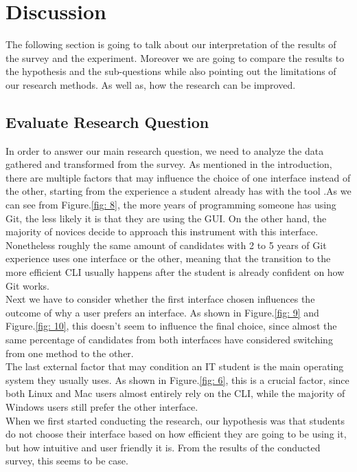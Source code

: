 \documentclass[]{report}
\begin{document}
	\section{Discussion}
	
	The following section is going to talk about our interpretation of the results of the survey and the experiment. Moreover we are going to compare the results to the hypothesis and the sub-questions while also pointing out the limitations of our research methods. As well as, how the research can be improved.
	
	\subsection{Evaluate Research Question}
	In order to answer our main research question, we need to analyze the data gathered and transformed from the survey.
	As mentioned in the introduction, there are multiple factors that may influence the choice of one interface instead of the other, starting from the experience a student already has with the tool .As we can see from Figure.\ref{fig: 8}, the more years of programming someone has using Git, the less likely it is that they are using the GUI. On the other hand, the majority of novices decide to approach this instrument with this interface. Nonetheless roughly the same amount of candidates with 2 to 5 years of Git experience uses one interface or the other, meaning that the transition to the more efficient CLI usually happens after the student is already confident on how Git works.\\
	Next we have to consider whether the first interface chosen influences the outcome of why a user prefers an interface. As shown in Figure.\ref{fig: 9} and Figure.\ref{fig: 10}, this doesn't seem to  influence the final choice, since almost the same percentage of candidates from both interfaces have considered switching from one method to the other.\\
	The last external factor that may condition an IT student is the main operating system they usually uses. As shown in Figure.\ref{fig: 6}, this is a crucial factor, since both Linux and Mac users almost entirely rely on the CLI, while the majority of Windows users still prefer the other interface.\\
	When we first started conducting the research, our hypothesis was that students do not choose their interface based on how efficient they are going to be using it, but how intuitive and user friendly it is.
	From the results of the conducted survey, this seems to be case.
\end{document}
